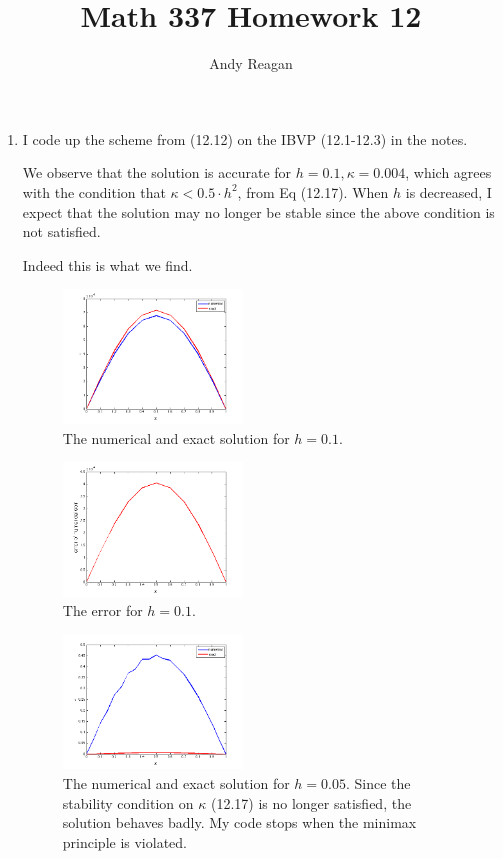 \documentclass[11pt]{article}
\author{Andy Reagan}
\title{Math 337 Homework 12}
\begin{document}
\maketitle

\begin{enumerate}

\item I code up the scheme from (12.12) on the IBVP (12.1-12.3) in the notes.

We observe that the solution is accurate for $h = 0.1, \kappa = 0.004$, which agrees with the condition that $\kappa < 0.5 \cdot h^2$, from Eq (12.17). When $h$ is decreased, I expect that the solution may no longer be stable since the above condition is not satisfied.

Indeed this is what we find.



\begin{figure}[h!]
  \centering
    \includegraphics[width=0.45\textwidth]{andy_hw12_prb01_02.png}
  \caption{The numerical and exact solution for $h=0.1$.}
\end{figure}

\begin{figure}[h!]
  \centering
    \includegraphics[width=0.45\textwidth]{andy_hw12_prb01_03.png}
  \caption{The error for $h=0.1$.}
\end{figure}

\begin{figure}[h!]
  \centering
    \includegraphics[width=0.45\textwidth]{andy_hw12_prb01_05.png}
  \caption{The numerical and exact solution for $h=0.05$.
           Since the stability condition on $\kappa$ (12.17) is no longer satisfied, the solution behaves badly.
           My code stops when the minimax principle is violated.}
\end{figure}


\end{enumerate}
\end{document}
